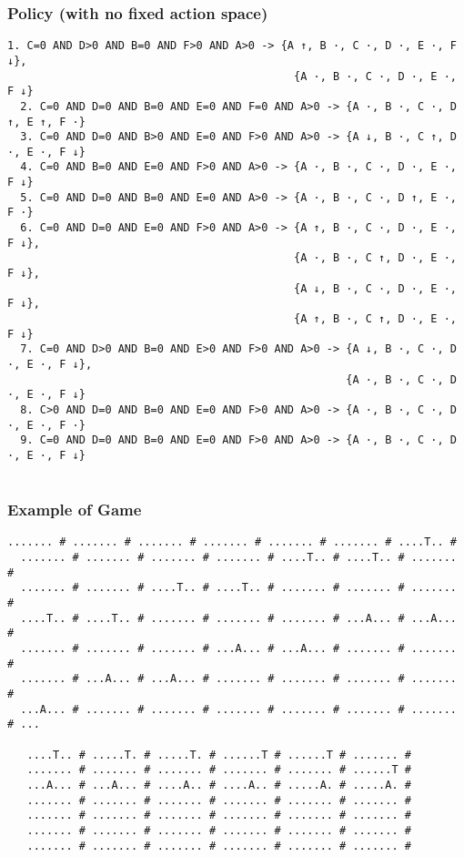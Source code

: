 \documentclass[a4paper]{article}
\begin{document}
\subsubsection{Policy (with no fixed action space)}
\begin{Verbatim}[fontsize=\footnotesize]
  1. C=0 AND D>0 AND B=0 AND F>0 AND A>0 -> {A ↑, B ·, C ·, D ·, E ·, F ↓},
                                            {A ·, B ·, C ·, D ·, E ·, F ↓}
  2. C=0 AND D=0 AND B=0 AND E=0 AND F=0 AND A>0 -> {A ·, B ·, C ·, D ↑, E ↑, F ·}
  3. C=0 AND D=0 AND B>0 AND E=0 AND F>0 AND A>0 -> {A ↓, B ·, C ↑, D ·, E ·, F ↓}
  4. C=0 AND B=0 AND E=0 AND F>0 AND A>0 -> {A ·, B ·, C ·, D ·, E ·, F ↓}
  5. C=0 AND D=0 AND B=0 AND E=0 AND A>0 -> {A ·, B ·, C ·, D ↑, E ·, F ·}
  6. C=0 AND D=0 AND E=0 AND F>0 AND A>0 -> {A ↑, B ·, C ·, D ·, E ·, F ↓},
                                            {A ·, B ·, C ↑, D ·, E ·, F ↓},
                                            {A ↓, B ·, C ·, D ·, E ·, F ↓},
                                            {A ↑, B ·, C ↑, D ·, E ·, F ↓}
  7. C=0 AND D>0 AND B=0 AND E>0 AND F>0 AND A>0 -> {A ↓, B ·, C ·, D ·, E ·, F ↓},
                                                    {A ·, B ·, C ·, D ·, E ·, F ↓}
  8. C>0 AND D=0 AND B=0 AND E=0 AND F>0 AND A>0 -> {A ·, B ·, C ·, D ·, E ·, F ·}
  9. C=0 AND D=0 AND B=0 AND E=0 AND F>0 AND A>0 -> {A ·, B ·, C ·, D ·, E ·, F ↓}


\end{Verbatim}

\subsubsection{Example of Game}
\begin{Verbatim}[fontsize=\footnotesize]
  ....... # ....... # ....... # ....... # ....... # ....... # ....T.. #
  ....... # ....... # ....... # ....... # ....T.. # ....T.. # ....... #
  ....... # ....... # ....T.. # ....T.. # ....... # ....... # ....... #
  ....T.. # ....T.. # ....... # ....... # ....... # ...A... # ...A... #
  ....... # ....... # ....... # ...A... # ...A... # ....... # ....... #
  ....... # ...A... # ...A... # ....... # ....... # ....... # ....... #
  ...A... # ....... # ....... # ....... # ....... # ....... # ....... # ...

   ....T.. # .....T. # .....T. # ......T # ......T # ....... #
   ....... # ....... # ....... # ....... # ....... # ......T #
   ...A... # ...A... # ....A.. # ....A.. # .....A. # .....A. #
   ....... # ....... # ....... # ....... # ....... # ....... #
   ....... # ....... # ....... # ....... # ....... # ....... #
   ....... # ....... # ....... # ....... # ....... # ....... #
   ....... # ....... # ....... # ....... # ....... # ....... #
\end{Verbatim}
\end{document}
